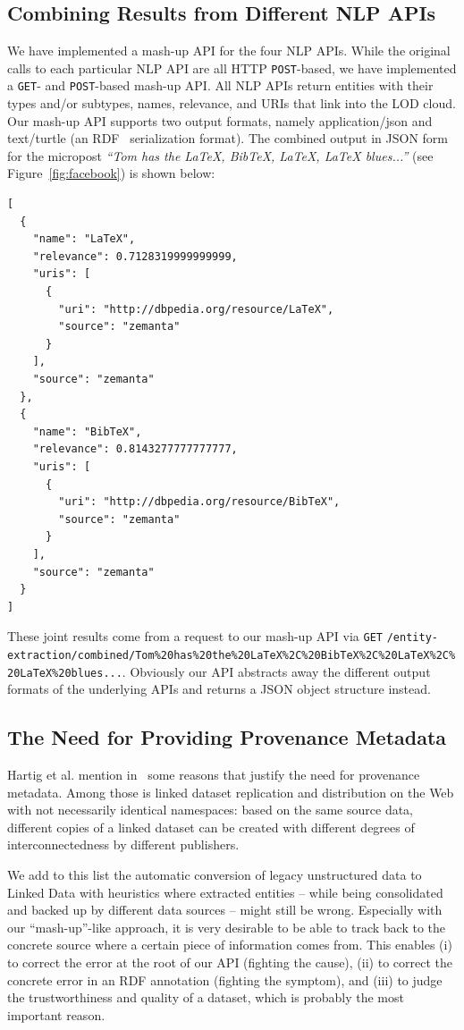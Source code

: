 \documentclass[twocolumn]{article}
\begin{document}
\subsection{Combining Results from Different NLP APIs}                     \label{sec:consolidation-nlp}
We have implemented a mash-up API for the four NLP APIs. While the original calls to each particular NLP API are all HTTP \texttt{POST}-based, we have implemented a \texttt{GET}- and \texttt{POST}-based mash-up API. All NLP APIs return entities with their types and/or subtypes, names, relevance, and URIs that link into the LOD cloud. Our mash-up API supports two output formats, namely application/json and text/turtle (an RDF~\cite{RDF} serialization format). The combined output in JSON form for the micropost \emph{``Tom has the LaTeX, BibTeX, LaTeX, LaTeX blues...''} (see Figure~\ref{fig:facebook}) is shown below:
\begin{lstlisting}
[
  {
    "name": "LaTeX",
    "relevance": 0.7128319999999999,
    "uris": [
      {
        "uri": "http://dbpedia.org/resource/LaTeX",
        "source": "zemanta"
      }
    ],
    "source": "zemanta"
  },
  {
    "name": "BibTeX",
    "relevance": 0.8143277777777777,
    "uris": [
      {
        "uri": "http://dbpedia.org/resource/BibTeX",
        "source": "zemanta"
      }
    ],
    "source": "zemanta"
  }  
]
\end{lstlisting}

These joint results come from a request to our mash-up API via \texttt{GET} \texttt{/entity-extraction/combined/Tom\%20has\%20\-the\%20LaTeX\%2C\%20BibTeX\%2C\%20\-LaTeX\%2C\%20LaTeX\%20blues...}. Obviously our API abstracts away the different output formats of the underlying APIs and returns a JSON object structure instead.

\subsection{The Need for Providing Provenance Metadata}
Hartig et al. mention in~\cite{ipaw10:olaf} some reasons that justify the need for provenance metadata. Among those is linked dataset replication and distribution on the Web with not necessarily identical namespaces: based on the same source data, different copies of a linked dataset can be created with different degrees of interconnectedness by different publishers.

We add to this list the automatic conversion of legacy unstructured data to Linked Data with heuristics where extracted entities -- while being consolidated and backed up by different data sources -- might still be wrong. Especially with our ``mash-up''-like approach, it is very desirable to be able to track back to the concrete source where a certain piece of information comes from. This enables (i) to correct the error at the root of our API (fighting the cause), (ii) to correct the concrete error in an RDF annotation (fighting the symptom), and (iii) to judge the trustworthiness and quality of a dataset, which is probably the most important reason.
\end{document}
